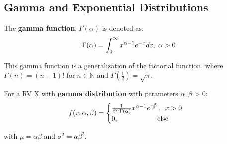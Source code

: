 \documentclass[10pt, letterpaper, twoside]{article}
\begin{document}
\begin{multicols}{2}
\subsection{Gamma and Exponential Distributions}

The \textbf{gamma function}, $\Gamma(\alpha)$ is denoted as:
\begin{equation*}
    \Gamma(\alpha) = \int_0^{\infty}x^{\alpha-1}e^{-x}dx, \hspace{0.1cm} \alpha > 0
\end{equation*}

\noindent This gamma function is a generalization of the factorial function, where $\Gamma(n) = (n-1)!$ for $n \in \mathbb{N}$ and $\Gamma(\frac{1}{2}) = \sqrt{\pi}$.

For a RV X with \textbf{gamma distribution} with parameters $\alpha, \beta$ > 0:
\begin{equation*}
    f(x;\alpha,\beta) = \begin{cases}
        \frac{1}{\beta^{\alpha}\Gamma(\alpha)}x^{\alpha-1}e^{\frac{-x}{\beta}}, \hspace{0.2cm} x>0 \\
        0, \hspace{2cm} \text{else}
    \end{cases}
\end{equation*}

with $\mu = \alpha\beta$ and $\sigma^2 = \alpha\beta^2$.


\end{multicols}
\end{document}
